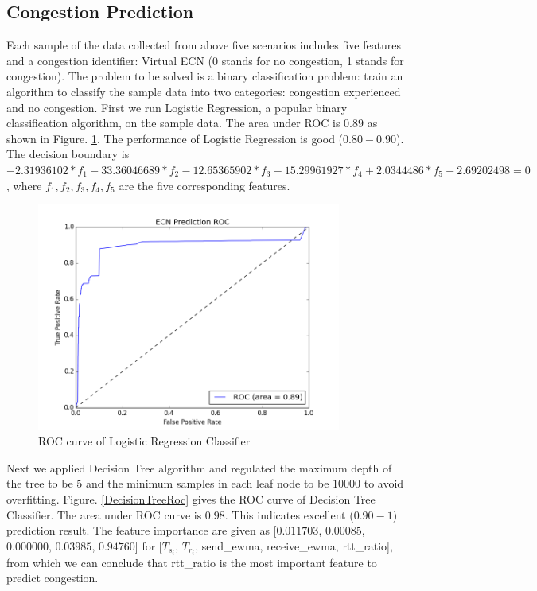 \subsection{Congestion Prediction}
\label{CongestionPredict}
\par Each sample of the data collected from above five scenarios includes five features and a congestion identifier: Virtual ECN (0 stands for no congestion, 1 stands for congestion). The problem to be solved is a binary classification problem: train an algorithm to classify the sample data into two categories: congestion experienced and no congestion. First we run Logistic Regression, a popular binary classification algorithm, on the sample data. The area under ROC is $0.89$ as shown in Figure. \ref{LRRoc}. The performance of Logistic Regression is good ($0.80 - 0.90$). The decision boundary is $ -2.31936102*f_{1} - 33.36046689*f_{2} - 12.65365902*f_{3} - 15.29961927*f_{4} + 2.0344486*f_{5} - 2.69202498 = 0$, where $f_{1}, f_{2}, f_{3}, f_{4}, f_{5}$ are the five corresponding features.
\begin{figure}
\centering
\includegraphics[width=10cm]{LRRoc.png}
\caption{ROC curve of Logistic Regression Classifier}
\label{LRRoc}
\end{figure}




\par Next we applied Decision Tree algorithm and regulated the maximum depth of the tree to be $5$ and the minimum samples in each leaf node to be $10000$ to avoid overfitting. Figure. \ref{DecisionTreeRoc} gives the ROC curve of Decision Tree Classifier. The area under ROC curve is $0.98$. This indicates excellent ($0.90 - 1$) prediction result. The feature importance are given as [$0.011703$, $0.00085$, $0.000000$, $0.03985$, $0.94760$] for [$T_{s_{i}}$, $T_{r_{i}}$, send\_ewma, receive\_ewma, rtt\_ratio], from which we can conclude that rtt\_ratio is the most important feature to predict congestion. 

